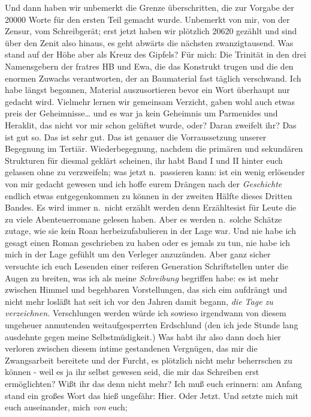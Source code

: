 \documentclass[
]{article}
\begin{document}
Und dann haben wir unbemerkt die Grenze überschritten, die zur Vorgabe
der 20000 Worte für den ersten Teil gemacht wurde. Unbemerkt von mir,
von der Zensur, vom Schreibgerät; erst jetzt haben wir plötzlich 20620
gezählt und sind über den Zenit also hinaus, es geht abwärts die
nächsten zwanzigtausend. Was stand auf der Höhe aber als Kreuz des
Gipfels? Für mich: Die Trinität in den drei Namensgebern der fratres HB
und Ewa, die das Konstrukt trugen und die den enormen Zuwachs
verantworten, der an Baumaterial fast täglich verschwand. Ich habe
längst begonnen, Material auszusortieren bevor ein Wort überhaupt nur
gedacht wird. Vielmehr lernen wir gemeinsam Verzicht, gaben wohl auch
etwas preis der Geheimnisse\ldots{} und es war ja kein Geheimnis um
Parmenides und Heraklit, das nicht vor mir schon gelüftet wurde, oder?
Daran zweifelt ihr? Das ist gut so. Das ist sehr gut. Das ist genauer
die Vorraussetzung unserer Begegnung im Tertiär. Wiederbegegnung,
nachdem die primären und sekundären Strukturen für diesmal geklärt
scheinen, ihr habt Band I und II hinter euch gelassen ohne zu
verzweifeln; was jetzt n.~passieren kann: ist ein wenig erlösender von
mir gedacht gewesen und ich hoffe eurem Drängen nach der
\emph{Geschichte} endlich etwas entgegenkommen zu können in der zweiten
Hälfte dieses Dritten Bandes. Es wird immer n.~nicht erzählt werden denn
Erzähltesist für Leute die zu viele Abenteuerromane gelesen haben. Aber
es werden n.~solche Schätze zutage, wie sie kein Roan herbeizufabulieren
in der Lage war. Und nie habe ich gesagt einen Roman geschrieben zu
haben oder es jemals zu tun, nie habe ich mich in der Lage gefühlt um
den Verleger anzuzünden. Aber ganz sicher versuchte ich euch Lesenden
einer reiferen Generation Schriftstellen unter die Augen zu breiten, was
ich als meine \emph{Schreibung} begriffen habe: es ist mehr zwischen
Himmel und begehbaren Vorstellungen, das sich eim aufdrängt und nicht
mehr losläßt hat seit ich vor den Jahren damit begann, \emph{die Tage zu
verzeichnen. }Verschlungen werden würde ich sowieso irgendwann von
diesem ungeheuer anmutenden weitaufgesperrten Erdschlund (den ich jede
Stunde lang ausdehnte gegen meine Selbstmüdigkeit.) Was habt ihr also
dann doch hier verloren zwischen diesem intime gestandenen Vergnügen,
das mir die Zwangsarbeit bereitete und der Furcht, es plötzlich nicht
mehr beherrschen zu können - weil es ja ihr selbst gewesen seid, die mir
das Schreiben erst ermöglichten? Wißt ihr das denn nicht mehr? Ich muß
euch erinnern: am Anfang stand ein großes Wort das hieß ungefähr: Hier.
Oder Jetzt. Und setzte mich mit euch auseinander, mich \emph{von} euch;
\end{document}
